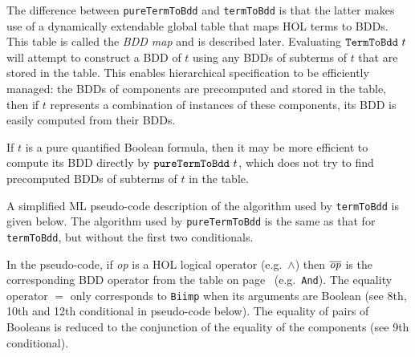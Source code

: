 \documentclass[12pt]{article}
\renewcommand{\t}[1]{\mbox{\tt #1}}
\newcommand\HOL{HOL\xspace}
\begin{document}
The difference between \t{pureTermToBdd} and \t{termToBdd} is that the
latter makes use of a dynamically extendable global table that maps
\HOL{} terms to BDDs. This table is called the {\it{BDD map\/}} and is
described later.  Evaluating $\t{TermToBdd}~t$ will attempt to
construct a BDD of $t$ using any BDDs of subterms of $t$ that are
stored in the table. This enables hierarchical specification to be
efficiently managed: the BDDs of components are precomputed and stored
in the table, then if $t$ represents a combination of instances of
these components, its BDD is easily computed from their BDDs.

If $t$ is a pure quantified Boolean formula, then it may be more
efficient to compute its BDD directly by $\t{pureTermToBdd}~t$,
which does not try to find precomputed BDDs of subterms of $t$ in the table.

A simplified ML pseudo-code description of the algorithm used by \t{termToBdd}
is given below. The algorithm used by \t{pureTermToBdd} is the same as
that for \t{termToBdd}, but without the first two conditionals.


In the pseudo-code, if {\it{op}} is a \HOL{} logical operator
(e.g.~$\wedge$) then $\overline{\it{op}}$ is the corresponding BDD
operator from the table on page~\pageref{bddops} (e.g.~\t{And}).  The
equality operator $=$ only corresponds to \t{Biimp} when its arguments
are Boolean (see 8th, 10th and 12th conditional in pseudo-code
below). The equality of pairs of Booleans is reduced to the
conjunction of the equality of the components (see 9th conditional).
\end{document}
